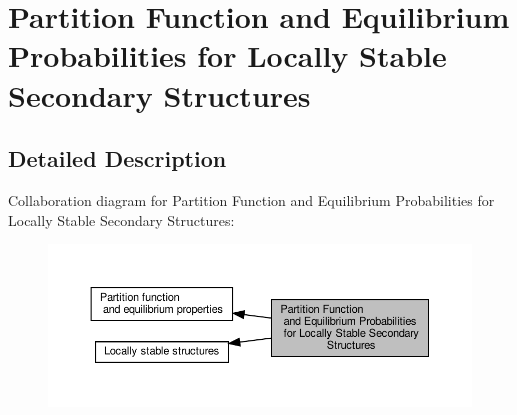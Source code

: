 \hypertarget{group__local__pf__fold}{}\section{Partition Function and Equilibrium Probabilities for Locally Stable Secondary Structures}
\label{group__local__pf__fold}


\subsection{Detailed Description}
Collaboration diagram for Partition Function and Equilibrium Probabilities for Locally Stable Secondary Structures\+:
\nopagebreak
\begin{figure}[H]
\begin{center}
\leavevmode
\includegraphics[width=350pt]{group__local__pf__fold}
\end{center}
\end{figure}
